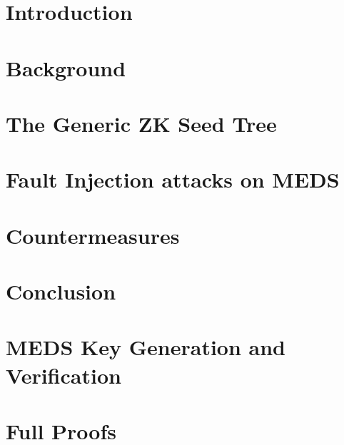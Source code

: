 \documentclass[runningheads]{llncs}
\begin{document}
\section{Introduction}
\label{sec:intro}


\section{Background}
\label{sec:background}


\section{The Generic ZK Seed Tree}
\label{sec:abstract}


\section{Fault Injection attacks on MEDS}
\label{sec:app}


\section{Countermeasures}
\label{sec:counter}


\section{Conclusion}
\label{sec:conclusion}





\appendix
\section{MEDS Key Generation and Verification}
\label{app:algs}


\section{Full Proofs}
\label{app:proofs}

\end{document}
